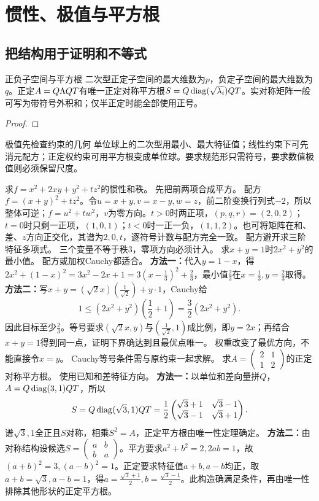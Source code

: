 \section{惯性、极值与平方根}
\subsection{把结构用于证明和不等式}
\begin{corollary}{正负子空间与平方根}
二次型正定子空间的最大维数为$p$，负定子空间的最大维数为$q$。正定$A=Q\Lambda QT$有唯一正定对称平方根$S=Q\operatorname{diag}(\sqrt{\lambda_i})QT$。实对称矩阵一般可写为带符号外积和；仅半正定时能全部使用正号。
\end{corollary}
\begin{proof}

\end{proof}
\begin{method}{极值先检查约束的几何}
单位球上的二次型用最小、最大特征值；线性约束下可先消元配方；正定权约束可用平方根变成单位球。要求规范形只需符号，要求数值极值则必须保留尺度。
\end{method}
{求$f=x^2+2xy+y^2+tz^2$的惯性和秩。}
{先把前两项合成平方。}
{配方$f=(x+y)^2+tz^2$。令$u=x+y,v=x-y,w=z$，前二阶变换行列式$-2$，所以整体可逆；$f=u^2+tw^2$，$v$为零方向。$t>0$时两正项，$(p,q,r)=(2,0,2)$；$t=0$时只剩一正项，$(1,0,1)$；$t<0$时一正一负，$(1,1,2)$。也可将矩阵在和、差、$z$方向正交化，其谱为$2,0,t$，逐符号计数与配方完全一致。}
{配方避开求三阶特征多项式。}
{三个变量不等于秩3，零项方向必须计入。}
{求$x+y=1$时$2x^2+y^2$的最小值。}
{配方或加权Cauchy都适合。}
{\textbf{方法一：}代入$y=1-x$，得$2x^2+(1-x)^2=3x^2-2x+1=3(x-\frac{1}{3})^2+\frac{2}{3}$，最小值$\frac{2}{3}$在$x=\frac{1}{3},y=\frac{2}{3}$取得。
\textbf{方法二：}写$x+y=(\sqrt2x)(\frac{1}{\sqrt2})+y\cdot1$，Cauchy给
\[1\le(2x^2+y^2)(\dfrac{1}{2}+1)=\dfrac32(2x^2+y^2).\]
因此目标至少$\frac{2}{3}$。等号要求$(\sqrt2x,y)$与$(\frac{1}{\sqrt2},1)$成比例，即$y=2x$；再结合$x+y=1$得到同一点，证明下界确达到且最优点唯一。}
{权重改变了最优方向，不能直接令$x=y$。}
{Cauchy等号条件需与原约束一起求解。}
{求$A=\begin{pmatrix}2&1\\1&2\end{pmatrix}$的正定对称平方根。}
{使用已知和差特征方向。}
{\textbf{方法一：}以单位和差向量拼$Q$，$A=Q\operatorname{diag}(3,1)QT$，所以
\[S=Q\operatorname{diag}(\sqrt3,1)QT=\dfrac12\begin{pmatrix}\sqrt3+1&\sqrt3-1\\\sqrt3-1&\sqrt3+1\end{pmatrix}.\]
谱$\sqrt3,1$全正且$S$对称，相乘$S^2=A$，正定平方根由唯一性定理确定。
\textbf{方法二：}由对称结构设候选$S=\begin{pmatrix}a&b\\b&a\end{pmatrix}$。平方要求$a^2+b^2=2,2ab=1$，故$(a+b)^2=3,(a-b)^2=1$。正定要求特征值$a+b,a-b$均正，取$a+b=\sqrt3,a-b=1$，得$a=\frac{\sqrt3+1}{2},b=\frac{\sqrt3-1}{2}$。此构造确满足条件，再由唯一性排除其他形状的正定平方根。}
